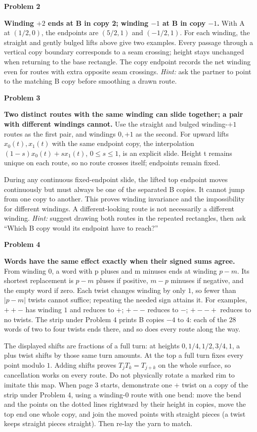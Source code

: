 \documentclass[11pt,letterpaper]{article}
\newcommand{\prob}[1]{\par\vspace{3pt}\textbf{Problem #1}\par}
\begin{document}
\prob{2}
\textbf{Winding $+2$ ends at B in copy 2; winding $-1$ at B in copy $-1$.}
With A at $(1/2,0)$, the endpoints are $(5/2,1)$ and $(-1/2,1)$.
For each winding, the straight and gently bulged lifts above give two examples.
Every passage through a vertical copy boundary corresponds to a seam crossing;
height stays unchanged when returning to the base rectangle.
The copy endpoint records the net winding even for routes with extra opposite
seam crossings. \textit{Hint:} ask the partner to point to the matching B copy
before smoothing a drawn route.

\prob{3}
\textbf{Two distinct routes with the same winding can slide together; a pair
with different windings cannot.} Use the straight and bulged winding-$+1$
routes as the first pair, and windings $0,+1$ as the second.
For upward lifts $x_0(t),x_1(t)$ with the same endpoint copy, the interpolation
$(1-s)x_0(t)+sx_1(t)$, $0\le s\le1$, is an explicit slide. Height t remains
unique on each route, so no route crosses itself; endpoints remain fixed.

During any continuous fixed-endpoint slide, the lifted top endpoint moves
continuously but must always be one of the separated B copies. It cannot jump
from one copy to another. This proves winding invariance and the impossibility
for different windings. A different-looking route is not necessarily a different
winding. \textit{Hint:} suggest drawing both routes in the repeated rectangles,
then ask ``Which B copy would its endpoint have to reach?''

\prob{4}
\textbf{Words have the same effect exactly when their signed sums agree.}
From winding $0$, a word with p pluses and m minuses ends at winding $p-m$.
Its shortest replacement is $p-m$ pluses if positive, $m-p$ minuses if negative,
and the empty word if zero. Each twist changes winding by only $1$, so fewer
than $|p-m|$ twists cannot suffice; repeating the needed sign attains it.
For examples, $++-$ has winding $1$ and reduces to $+$;
$+--$ reduces to $-$; $+--+$ reduces to no twists.
The strip under Problem 4 prints B copies $-4$ to $4$: each of the 28 words of
two to four twists ends there, and so does every route along the way.

The displayed shifts are fractions of a full turn: at heights
$0,1/4,1/2,3/4,1$, a plus twist shifts by those same turn amounts.
At the top a full turn fixes every point modulo $1$.
Adding shifts proves $T_jT_k=T_{j+k}$ on the whole surface, so cancellation
works on every route. Do not physically rotate a marked rim to imitate this map.
When page 3 starts, demonstrate one $+$ twist on a copy of the strip under
Problem 4, using a winding-0 route with one bend: move the bend and the points on
the dotted lines rightward by their height in copies, move the top end one whole
copy, and join the moved points with straight pieces (a twist keeps straight
pieces straight). Then re-lay the yarn to match.
\end{document}
